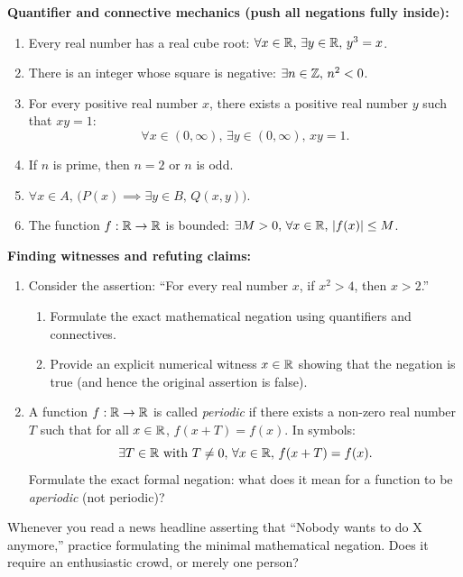 \textbf{Quantifier and connective mechanics (push all negations fully inside):}
\begin{enumerate}
\item Every real number has a real cube root: $\forall x \in \mathbb{R}, \, \exists y \in \mathbb{R}, \, y^3 = x$.
\item There is an integer whose square is negative: $\exists n \in \mathbb{Z}, \, n^2 < 0$.
\item For every positive real number $x$, there exists a positive real number $y$ such that $xy = 1$:
\[
\forall x \in (0, \infty), \, \exists y \in (0, \infty), \, xy = 1.
\]
\item If $n$ is prime, then $n = 2$ or $n$ is odd.
\item $\forall x \in A, \, \bigl(P(x) \implies \exists y \in B, \, Q(x, y)\bigr)$.
\item The function $f : \mathbb{R} \to \mathbb{R}$ is bounded: $\exists M > 0, \, \forall x \in \mathbb{R}, \, |f(x)| \le M$.
\end{enumerate}

\textbf{Finding witnesses and refuting claims:}
\begin{enumerate}
\item Consider the assertion: ``For every real number $x$, if $x^2 > 4$, then $x > 2$.''
\begin{enumerate}
    \item Formulate the exact mathematical negation using quantifiers and connectives.
    \item Provide an explicit numerical witness $x \in \mathbb{R}$ showing that the negation is true (and hence the original assertion is false).
\end{enumerate}
\item A function $f : \mathbb{R} \to \mathbb{R}$ is called \emph{periodic} if there exists a non-zero real number $T$ such that for all $x \in \mathbb{R}$, $f(x + T) = f(x)$. In symbols:
\[
\exists T \in \mathbb{R} \text{ with } T \ne 0, \, \forall x \in \mathbb{R}, \, f(x + T) = f(x).
\]
Formulate the exact formal negation: what does it mean for a function to be \emph{aperiodic} (not periodic)?
\end{enumerate}

\begin{walkbox}
Whenever you read a news headline asserting that ``Nobody wants to do X anymore,'' practice formulating the minimal mathematical negation. Does it require an enthusiastic crowd, or merely one person?
\end{walkbox}

\newpage
